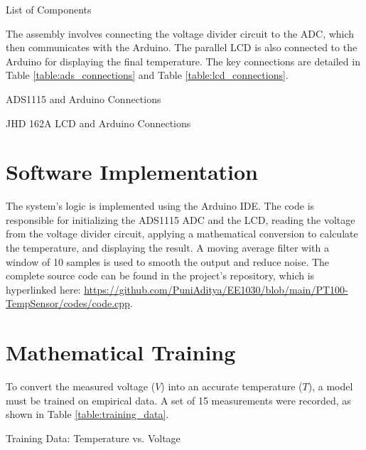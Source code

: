\documentclass[conference]{IEEEtran}
\begin{document}
\begin{table}[!h]
  \centering
  \caption{List of Components}
  \label{table:list}
  
\end{table}

The assembly involves connecting the voltage divider circuit to the ADC, which then communicates with the Arduino. The parallel LCD is also connected to the Arduino for displaying the final temperature. The key connections are detailed in Table \ref{table:ads_connections} and Table \ref{table:lcd_connections}.

\begin{table}[h!]
  \centering
  \caption{ADS1115 and Arduino Connections}
  \label{table:ads_connections}
  
\end{table}

\begin{table}[h!]
  \centering
  \caption{JHD 162A LCD and Arduino Connections}
  \label{table:lcd_connections}
  
\end{table}

\section{Software Implementation}
The system's logic is implemented using the Arduino IDE. The code is responsible for initializing the ADS1115 ADC and the LCD, reading the voltage from the voltage divider circuit, applying a mathematical conversion to calculate the temperature, and displaying the result. A moving average filter with a window of 10 samples is used to smooth the output and reduce noise. The complete source code can be found in the project's repository, which is hyperlinked here: {\url{https://github.com/PuniAditya/EE1030/blob/main/PT100-TempSensor/codes/code.cpp}}.


\section{Mathematical Training}
To convert the measured voltage ($V$) into an accurate temperature ($T$), a model must be trained on empirical data. A set of 15 measurements were recorded, as shown in Table \ref{table:training_data}.

\begin{table}[!h]
  \centering
  \caption{Training Data: Temperature vs. Voltage}
  \label{table:training_data}
  
\end{table}
\end{document}
